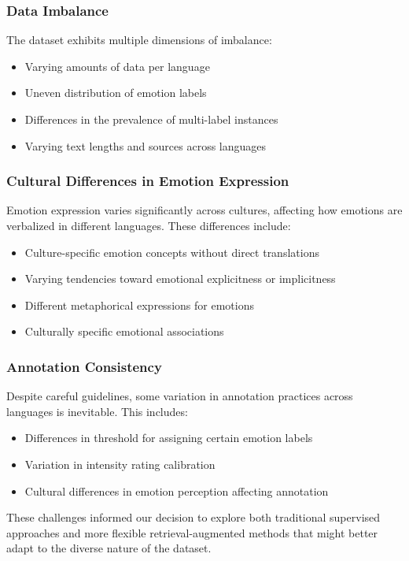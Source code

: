 \documentclass[a4paper,12pt]{extarticle}
\begin{document}
\subsubsection{Data Imbalance}

The dataset exhibits multiple dimensions of imbalance:
\begin{itemize}
\item Varying amounts of data per language
\item Uneven distribution of emotion labels
\item Differences in the prevalence of multi-label instances
\item Varying text lengths and sources across languages
\end{itemize}

\subsubsection{Cultural Differences in Emotion Expression}

Emotion expression varies significantly across cultures, affecting how emotions are verbalized in different languages. These differences include:
\begin{itemize}
\item Culture-specific emotion concepts without direct translations
\item Varying tendencies toward emotional explicitness or implicitness
\item Different metaphorical expressions for emotions
\item Culturally specific emotional associations
\end{itemize}

\subsubsection{Annotation Consistency}

Despite careful guidelines, some variation in annotation practices across languages is inevitable. This includes:
\begin{itemize}
\item Differences in threshold for assigning certain emotion labels
\item Variation in intensity rating calibration
\item Cultural differences in emotion perception affecting annotation
\end{itemize}

These challenges informed our decision to explore both traditional supervised approaches and more flexible retrieval-augmented methods that might better adapt to the diverse nature of the dataset.
\end{document}
